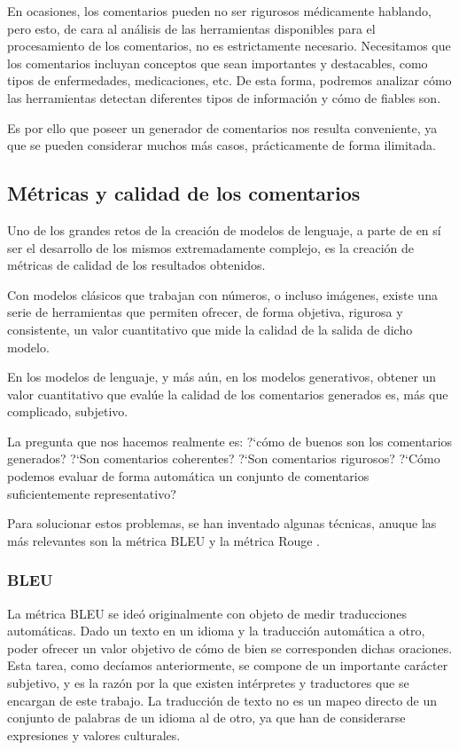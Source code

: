 En ocasiones, los comentarios pueden no ser rigurosos médicamente hablando, pero esto, de cara al análisis de las herramientas disponibles para el procesamiento de los comentarios, no es estrictamente necesario. Necesitamos que los comentarios incluyan conceptos que sean importantes y destacables, como tipos de enfermedades, medicaciones, etc. De esta forma, podremos analizar cómo las herramientas detectan diferentes tipos de información y cómo de fiables son. 

Es por ello que poseer un generador de comentarios nos resulta conveniente, ya que se pueden considerar muchos más casos, prácticamente de forma ilimitada.

\subsection{Métricas y calidad de los comentarios}

Uno de los grandes retos de la creación de modelos de lenguaje, a parte de en sí ser el desarrollo de los mismos extremadamente complejo, es la creación de métricas de calidad de los resultados obtenidos.

Con modelos clásicos que trabajan con números, o incluso imágenes, existe una serie de herramientas que permiten ofrecer, de forma objetiva, rigurosa y consistente, un valor cuantitativo que mide la calidad de la salida de dicho modelo.

En los modelos de lenguaje, y más aún, en los modelos generativos, obtener un valor cuantitativo que evalúe la calidad de los comentarios generados es, más que complicado, subjetivo.

La pregunta que nos hacemos realmente es: ?`cómo de buenos son los comentarios generados? ?`Son comentarios coherentes? ?`Son comentarios rigurosos? ?`Cómo podemos evaluar de forma automática un conjunto de comentarios suficientemente representativo?

Para solucionar estos problemas, se han inventado algunas técnicas, anuque las más relevantes son la métrica BLEU \cite{BLEU} y la métrica Rouge \cite{lin2004rouge}.

\subsubsection{BLEU}
La métrica BLEU se ideó originalmente con objeto de medir traducciones automáticas. Dado un texto en un idioma y la traducción automática a otro, poder ofrecer un valor objetivo de cómo de bien se corresponden dichas oraciones. Esta tarea, como decíamos anteriormente, se compone de un importante carácter subjetivo, y es la razón por la que existen intérpretes y traductores que se encargan de este trabajo. La traducción de texto no es un mapeo directo de un conjunto de palabras de un idioma al de otro, ya que han de considerarse expresiones y valores culturales.

